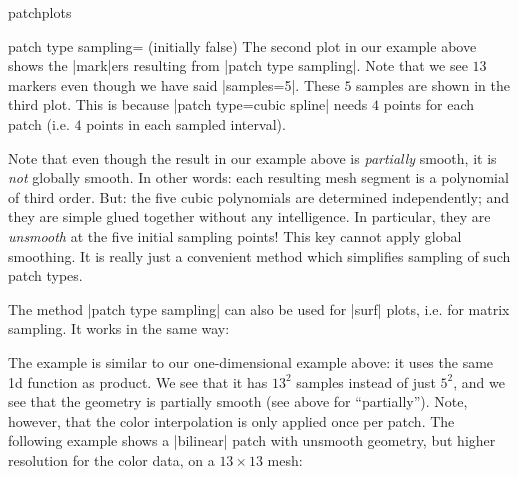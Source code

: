 {\begin{pgfplotslibrary}{patchplots}
\begin{pgfplotskey}{patch type sampling= (initially false)}
    The second plot in our example above shows the |mark|ers resulting from
    |patch type sampling|. Note that we see $13$ markers even though we have
    said |samples=5|. These $5$ samples are shown in the third plot. This is
    because |patch type=cubic spline| needs $4$ points for each patch (i.e.\@
    $4$ points in each sampled interval).

    Note that even though the result in our example above is \emph{partially}
    smooth, it is \emph{not} globally smooth. In other words: each resulting
    mesh segment is a polynomial of third order. But: the five cubic
    polynomials are determined independently; and they are simple glued
    together without any intelligence. In particular, they are \emph{unsmooth}
    at the five initial sampling points! This key cannot apply global
    smoothing. It is really just a convenient method which simplifies sampling
    of such patch types.

    The method |patch type sampling| can also be used for |surf| plots, i.e.\@
    for matrix sampling. It works in the same way:
\begin{codeexample}[]
\end{codeexample}
    The example is similar to our one-dimensional example above: it uses the
    same 1d function as product. We see that it has $13^2$ samples instead of
    just $5^2$, and we see that the geometry is partially smooth (see above for
    ``partially''). Note, however, that the color interpolation is only applied
    once per patch. The following example shows a |bilinear| patch with
    unsmooth geometry, but higher resolution for the color data, on a
    $13\times13$ mesh:
\begin{codeexample}[]
\end{codeexample}
\end{pgfplotskey}
\end{pgfplotslibrary}}
